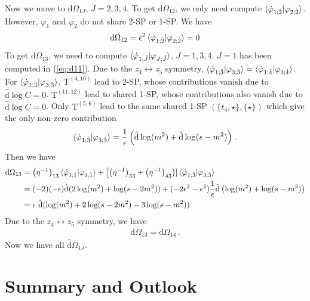 \documentclass[a4paper,11pt]{article}
\newcommand{\nn}{\nonumber}
\newcommand{\nd}{\mathrm{d}}
\newcommand{\nT}{\mathrm{T}}
\newcommand{\nds}{\hat{\mathrm{d}}}
\newcommand{\ep}{\epsilon}
\def\eref#1{(\ref{#1})}
\begin{document}
Now we move to $\nd \Omega_{1J}$, $J=2,3,4$. To get $\nd \Omega_{12}$, we only need compute $\braket{\dot{\varphi}_{1;\hat{2}}|\varphi_{2;\hat{2}}}$. However, $\varphi_1$ and $\varphi_2$  do not share 2-SP or 1-SP. We have
\begin{align} 
\nd \Omega_{12} = \ep^2 \braket{\dot{\varphi}_{1;\hat{2}}|\varphi_{2;\hat{2}}} = 0
\end{align}
To get $\nd \Omega_{13}$, we need to compute $\braket{\dot{\varphi}_{1;\hat{J}}|\varphi_{J;\hat{J}}}$, $J=1,3,4$. $J=1$ has been computed in \eref{eq:d11}. Due to the $z_4\leftrightarrow z_5$ symmetry, $\braket{\dot{\varphi}_{1;\hat{3}}|\varphi_{3;\hat{3}}}= \braket{\dot{\varphi}_{1;\hat{4}}|\varphi_{3;\hat{4}}}$.
For $\braket{\dot{\varphi}_{1;\hat{3}}|\varphi_{3;\hat{3}}}$, $\nT^{(4,10)}$ lead to 2-SP, whose contributions vanish due to $\nds \log C = 0$. $\nT^{(11,12)}$ lead to shared 1-SP, whose contributions also vanish due to $\nds \log C = 0$. Only $\nT^{(5,6)}$ lead to the same shared 1-SP $(\{t_4,\star\},\{\star\})$ which give the only non-zero contribution
\begin{align}
\braket{\dot{\varphi}_{1;\hat{3}}|\varphi_{3;\hat{3}}}=\frac{1}{\ep} \left( \nds \log(m^2) + \nds \log(s-m^2) \right) \, . \label{eq:NPTCLetter}
\end{align}
Then we have
\begin{align} 
\nd \Omega_{13}&=\left(\eta^{-1}\right)_{13} \braket{\dot{\varphi}_{1;\hat{1}}|\varphi_{1;\hat{1}}}  +  \left[\left(\eta^{-1}\right)_{33}+\left(\eta^{-1}\right)_{43}\right)]\braket{\dot{\varphi}_{1;\hat{3}}|\varphi_{3;\hat{3}}}  \nn\\
&= (-2)( -\ep)\nds (2  \log (m^2) +  \log (s-2m^2) )+ (-2 \ep^2 - \ep^2)\frac{1}{\ep} \nds \left( \log(m^2) + \log(s-m^2) \right)\nn\\
&=\ep ~ \nds (\log (m^2)+ 2\log (s-2m^2) - 3 \log(s-m^2)         )
\end{align}
Due to the  $z_4\leftrightarrow z_5$ symmetry, we have
\begin{align} 
\nd \Omega_{13} =\nd \Omega_{14}\, . %
\end{align}
Now we have all $\nds \Omega_{1J}$.




\section{Summary and Outlook}\label{final}
\end{document}

